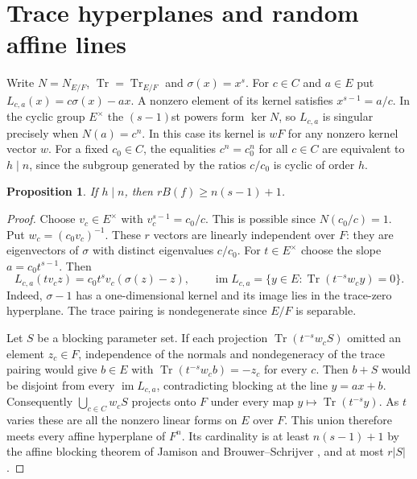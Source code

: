 \documentclass[preprint,12pt,numbers]{elsarticle}
\newtheorem{proposition}[theorem]{Proposition}
\begin{document}
\section{Trace hyperplanes and random affine lines}
\label{sec:positive}

Write $N=N_{E/F}$, $\operatorname{Tr}=\operatorname{Tr}_{E/F}$ and
$\sigma(x)=x^s$. For $c\in C$ and $a\in E$ put $L_{c,a}(x)=c\sigma(x)-ax$.
A nonzero element of its kernel satisfies $x^{s-1}=a/c$. In the cyclic
group $E^\times$ the $(s-1)$st powers form $\ker N$, so $L_{c,a}$ is singular
precisely when $N(a)=c^n$. In this case its kernel is $wF$ for any nonzero
kernel vector $w$. For a fixed $c_0\in C$, the equalities $c^n=c_0^n$
for all $c\in C$ are equivalent to $h\mid n$, since the subgroup generated
by the ratios $c/c_0$ is cyclic of order $h$.

\begin{proposition}\label{prop:trace-hyperplanes}
If $h\mid n$, then $rB(f)\ge n(s-1)+1$.
\end{proposition}
\begin{proof}
Choose $v_c\in E^\times$ with $v_c^{s-1}=c_0/c$. This is possible since
$N(c_0/c)=1$. Put $w_c=(c_0v_c)^{-1}$. These $r$ vectors are linearly
independent over $F$: they are eigenvectors of $\sigma$ with distinct
eigenvalues $c/c_0$. For $t\in E^\times$ choose the slope $a=c_0t^{s-1}$.
Then
\[
 L_{c,a}(tv_cz)=c_0t^sv_c(\sigma(z)-z),\qquad
 \operatorname{im} L_{c,a}
  =\{y\in E:\operatorname{Tr}(t^{-s}w_c y)=0\}.
\]
Indeed, $\sigma-1$ has a one-dimensional kernel and its image lies in
the trace-zero hyperplane. The trace pairing is nondegenerate since $E/F$ is separable.

Let $S$ be a blocking parameter set. If each projection
$\operatorname{Tr}(t^{-s}w_c S)$ omitted an element $z_c\in F$, independence
of the normals and nondegeneracy of the trace pairing would give
$b\in E$ with $\operatorname{Tr}(t^{-s}w_cb)=-z_c$ for every $c$.
Then $b+S$ would be disjoint from every $\operatorname{im} L_{c,a}$,
contradicting blocking at the line $y=ax+b$. Consequently
$\bigcup_{c\in C}w_c S$ projects onto $F$ under every map
$y\mapsto\operatorname{Tr}(t^{-s}y)$. As $t$ varies these are all the
nonzero linear forms on $E$ over $F$. This union therefore meets every
affine hyperplane of $F^n$. Its cardinality is at least $n(s-1)+1$ by
the affine blocking theorem of Jamison and Brouwer--Schrijver
\cite{BS,Jamison}, and at most $r|S|$.
\end{proof}
\end{document}
